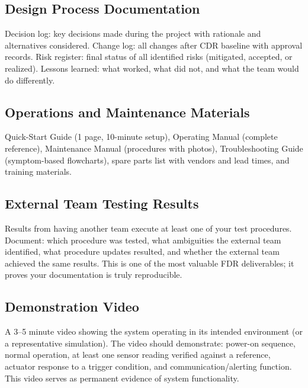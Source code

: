 \documentclass[11pt,letterpaper,twoside,openany]{book}
\begin{document}
\subsection{Design Process Documentation}
Decision log: key decisions made during the project with rationale and alternatives considered. Change log: all changes after CDR baseline with approval records. Risk register: final status of all identified risks (mitigated, accepted, or realized). Lessons learned: what worked, what did not, and what the team would do differently.

\subsection{Operations and Maintenance Materials}
Quick-Start Guide (1 page, 10-minute setup), Operating Manual (complete reference), Maintenance Manual (procedures with photos), Troubleshooting Guide (symptom-based flowcharts), spare parts list with vendors and lead times, and training materials.


\subsection{External Team Testing Results}
Results from having another team execute at least one of your test procedures. Document: which procedure was tested, what ambiguities the external team identified, what procedure updates resulted, and whether the external team achieved the same results. This is one of the most valuable FDR deliverables; it proves your documentation is truly reproducible.

\subsection{Demonstration Video}
A 3--5 minute video showing the system operating in its intended environment (or a representative simulation). The video should demonstrate: power-on sequence, normal operation, at least one sensor reading verified against a reference, actuator response to a trigger condition, and communication/alerting function. This video serves as permanent evidence of system functionality.
\end{document}
